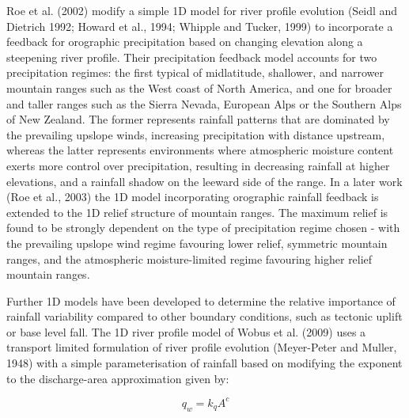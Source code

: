 Roe et al. (2002) modify a simple 1D model for river profile evolution (Seidl and Dietrich 1992; Howard et al., 1994; Whipple and Tucker, 1999) to incorporate a feedback for orographic precipitation based on changing elevation along a steepening river profile. Their precipitation feedback model accounts for two precipitation regimes: the first typical of midlatitude, shallower, and narrower mountain ranges such as the West coast of North America, and one for broader and taller ranges such as the Sierra Nevada, European Alps or the Southern Alps of New Zealand. The former represents rainfall patterns that are dominated by the prevailing upslope winds, increasing precipitation with distance upstream, whereas the latter represents environments where atmospheric moisture content exerts more control over precipitation, resulting in decreasing rainfall at higher elevations, and a rainfall shadow on the leeward side of the range. In a later work (Roe et al., 2003) the 1D model incorporating orographic rainfall feedback is extended to the 1D relief structure of mountain ranges. The maximum relief is found to be strongly dependent on the type of precipitation regime chosen - with the prevailing upslope wind regime favouring lower relief, symmetric mountain ranges, and the atmospheric moisture-limited regime favouring higher relief mountain ranges.

Further 1D models have been developed to determine the relative importance of rainfall variability compared to other boundary conditions, such as tectonic uplift or base level fall. The 1D river profile model of Wobus et al. (2009) uses a transport limited formulation of river profile evolution (Meyer-Peter and Muller, 1948) with a simple parameterisation of rainfall based on modifying the exponent to the discharge-area approximation given by:

\begin{equation}
q_w = k_qA^c
\end{equation}

